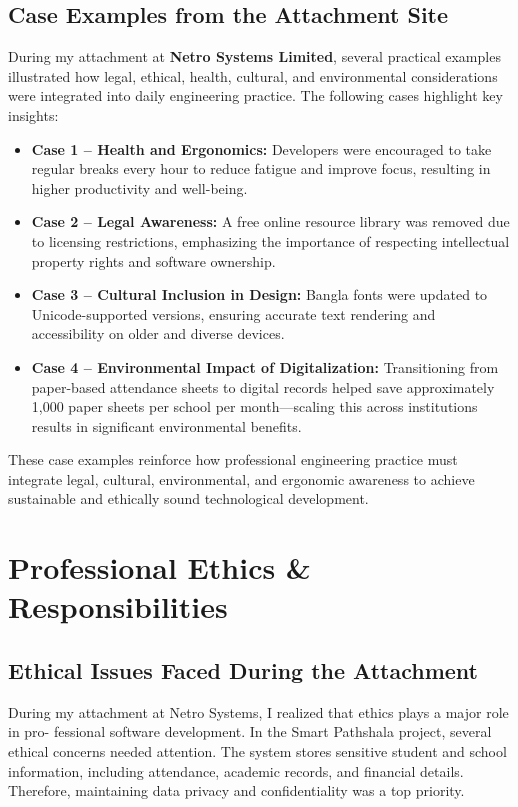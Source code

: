 \documentclass[12pt,a4paper]{report}
\newcommand{\company}[1]{\textcolor{companycolor}{\textbf{#1}}}
\newenvironment{coloritemize}
{\begin{itemize}[label=\textcolor{primaryblue}{$\bullet$}]}
{\end{itemize}}
\begin{document}
\section{Case Examples from the Attachment Site}
During my attachment at \company{Netro Systems Limited}, several practical examples illustrated how legal, ethical, health, cultural, and environmental considerations were integrated into daily engineering practice. The following cases highlight key insights:

\begin{coloritemize}
    \item \textcolor{secondaryblue}{\textbf{Case 1 – Health and Ergonomics:}} Developers were encouraged to take regular breaks every hour to reduce fatigue and improve focus, resulting in higher productivity and well-being.
    
    \item \textcolor{secondaryblue}{\textbf{Case 2 – Legal Awareness:}} A free online resource library was removed due to licensing restrictions, emphasizing the importance of respecting intellectual property rights and software ownership.
    
    \item \textcolor{secondaryblue}{\textbf{Case 3 – Cultural Inclusion in Design:}} Bangla fonts were updated to Unicode-supported versions, ensuring accurate text rendering and accessibility on older and diverse devices.
    
    \item \textcolor{secondaryblue}{\textbf{Case 4 – Environmental Impact of Digitalization:}} Transitioning from paper-based attendance sheets to digital records helped save approximately 1,000 paper sheets per school per month—scaling this across institutions results in significant environmental benefits.
\end{coloritemize}

These case examples reinforce how professional engineering practice must integrate legal, cultural, environmental, and ergonomic awareness to achieve sustainable and ethically sound technological development.


\chapter{Professional Ethics \& Responsibilities}
\section{Ethical Issues Faced During the Attachment}
During my attachment at Netro Systems, I realized that ethics plays a major role in pro-
fessional software development. In the Smart Pathshala project, several ethical concerns
needed attention. The system stores sensitive student and school information, including
attendance, academic records, and financial details. Therefore, maintaining data privacy
and confidentiality was a top priority.\\
\end{document}
